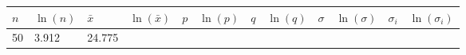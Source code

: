 \documentclass{article}
\begin{document}
    \begin{longtable}[]{@{}llllllllllll@{}}
\toprule
\begin{minipage}[b]{0.03\columnwidth}\raggedright\strut
\(n\)\strut
\end{minipage} & \begin{minipage}[b]{0.06\columnwidth}\raggedright\strut
\(\ln(n)\)\strut
\end{minipage} & \begin{minipage}[b]{0.06\columnwidth}\raggedright\strut
\(\bar{x}\)\strut
\end{minipage} & \begin{minipage}[b]{0.08\columnwidth}\raggedright\strut
\(\ln(\bar{x})\)\strut
\end{minipage} & \begin{minipage}[b]{0.03\columnwidth}\raggedright\strut
\(p\)\strut
\end{minipage} & \begin{minipage}[b]{0.06\columnwidth}\raggedright\strut
\(\ln(p)\)\strut
\end{minipage} & \begin{minipage}[b]{0.03\columnwidth}\raggedright\strut
\(q\)\strut
\end{minipage} & \begin{minipage}[b]{0.06\columnwidth}\raggedright\strut
\(\ln(q)\)\strut
\end{minipage} & \begin{minipage}[b]{0.06\columnwidth}\raggedright\strut
\(\sigma\)\strut
\end{minipage} & \begin{minipage}[b]{0.08\columnwidth}\raggedright\strut
\(\ln(\sigma)\)\strut
\end{minipage} & \begin{minipage}[b]{0.06\columnwidth}\raggedright\strut
\(\sigma_i\)\strut
\end{minipage} & \begin{minipage}[b]{0.09\columnwidth}\raggedright\strut
\(\ln(\sigma_i)\)\strut
\end{minipage}\tabularnewline
\midrule
\endhead
\begin{minipage}[t]{0.03\columnwidth}\raggedright\strut
50\strut
\end{minipage} & \begin{minipage}[t]{0.06\columnwidth}\raggedright\strut
3.912\strut
\end{minipage} & \begin{minipage}[t]{0.06\columnwidth}\raggedright\strut
24.775\strut

\end{minipage}
\end{longtable}
\end{document}
